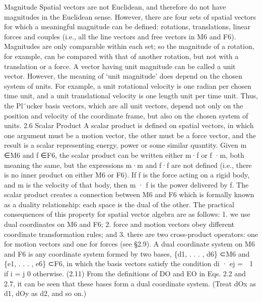 Magnitude Spatial vectors are not Euclidean, and therefore do not have magnitudes in the Euclidean sense. However, there are four sets of spatial vectors for which a meaningful magnitude can be defined: rotations, translations, linear forces and couples (i.e., all the line vectors and free vectors in M6 and F6). Magnitudes are only comparable within each set; so the magnitude of a rotation, for example, can be compared with that of another rotation, but not with a translation or a force. A vector having unit magnitude can be called a unit vector. However, the meaning of ‘unit magnitude’ does depend on the chosen system of units. For example, a unit rotational velocity is one radian per chosen time unit, and a unit translational velocity is one length unit per time unit. Thus, the Pl¨ucker basis vectors, which are all unit vectors, depend not only on the position and velocity of the coordinate frame, but also on the chosen system of units. 2.6 Scalar Product A scalar product is defined on spatial vectors, in which one argument must be a motion vector, the other must be a force vector, and the result is a scalar representing energy, power or some similar quantity. Given m ∈M6 and f ∈F6, the scalar product can be written either m·f or f ·m, both meaning the same, but the expressions m·m and f·f are not defined (i.e., there is no inner product on either M6 or F6). If f is the force acting on a rigid body, and m is the velocity of that body, then m · f is the power delivered by f. The scalar product creates a connection between M6 and F6 which is formally known as a duality relationship: each space is the dual of the other. The practical consequences of this property for spatial vector algebra are as follows: 1. we use dual coordinates on M6 and F6; 2. force and motion vectors obey different coordinate transformation rules; and 3. there are two cross-product operators: one for motion vectors and one for forces (see §2.9). A dual coordinate system on M6 and F6 is any coordinate system formed by two bases, \{d1, . . . , d6\} ⊂M6 and \{e1, . . . , e6\} ⊂F6, in which the basis vectors satisfy the condition di · ej =  1 if i = j 0 otherwise. (2.11) From the definitions of DO and EO in Eqs. 2.2 and 2.7, it can be seen that these bases form a dual coordinate system. (Treat dOx as d1, dOy as d2, and so on.)

